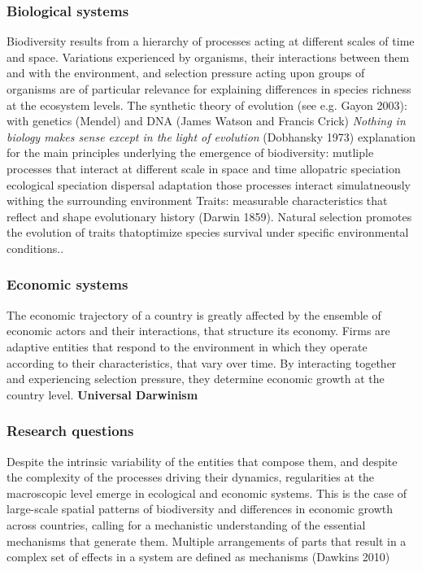 \subsubsection{Biological systems}
\begin{outline}
    \1 Biodiversity results from a hierarchy of processes acting at different scales of time and space. Variations experienced by organisms, their interactions between them and with the environment, and selection pressure acting upon groups of organisms are of particular relevance for explaining differences in species richness at the ecosystem levels.
            \2 The synthetic  theory of evolution (see e.g. Gayon 2003): with genetics (Mendel) and DNA (James Watson and Francis Crick)
            \2 \textit{Nothing in biology makes sense except in the light of evolution} (Dobhansky 1973)
    \1 explanation for the main principles underlying the emergence of biodiversity: mutliple processes that interact at different scale in space and time 
            \2 allopatric speciation
            \2 ecological speciation 
            \2 dispersal
            \2 adaptation
            \2 those processes interact simulatneously withing the surrounding environment
    \1 Traits: measurable characteristics that reflect and shape evolutionary history (Darwin 1859). Natural selection promotes the evolution of traits thatoptimize species survival under specific environmental conditions..
\end{outline}
\subsubsection{Economic systems}
\begin{outline}
    \1 The economic trajectory of a country is greatly affected by the ensemble of economic actors and their interactions, that structure its economy. Firms are adaptive entities that respond to the environment in which they operate according to their characteristics, that vary over time. By interacting together and experiencing selection pressure, they determine economic growth at the country level.
        \2 \textbf{Universal Darwinism}
\end{outline}
\subsubsection{Research questions}
\begin{outline}
    \1 Despite the intrinsic variability of the entities that compose them, and despite the complexity of the processes driving their dynamics, regularities at the macroscopic level emerge in ecological and economic systems. This is the case of large-scale spatial patterns of biodiversity and differences in economic growth across countries, calling for a mechanistic understanding of the essential mechanisms that generate them.
        \2 Multiple arrangements of parts that result in a complex set of effects in a system are defined as mechanisms (Dawkins 2010)
\end{outline}

